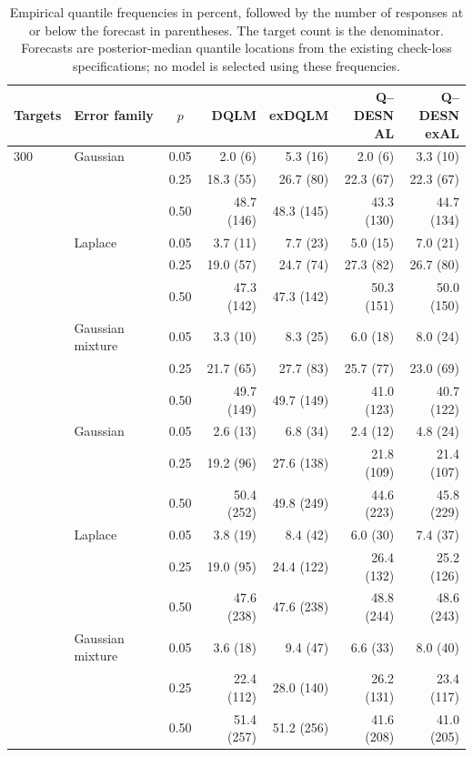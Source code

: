 \begin{table}[!htbp]
\centering
\footnotesize
{}
\setlength{\tabcolsep}{3.5pt}
\begin{tabular}{@{}llcrrrr@{}}
\toprule
Targets & Error family & $p$ & DQLM & exDQLM & \shortstack{Q--DESN\\AL} & \shortstack{Q--DESN\\exAL} \\
\midrule
300 & Gaussian & 0.05 & 2.0 (6) & 5.3 (16) & 2.0 (6) & 3.3 (10) \\
 &  & 0.25 & 18.3 (55) & 26.7 (80) & 22.3 (67) & 22.3 (67) \\
 &  & 0.50 & 48.7 (146) & 48.3 (145) & 43.3 (130) & 44.7 (134) \\
\addlinespace[3pt]
 & Laplace & 0.05 & 3.7 (11) & 7.7 (23) & 5.0 (15) & 7.0 (21) \\
 &  & 0.25 & 19.0 (57) & 24.7 (74) & 27.3 (82) & 26.7 (80) \\
 &  & 0.50 & 47.3 (142) & 47.3 (142) & 50.3 (151) & 50.0 (150) \\
\addlinespace[3pt]
 & Gaussian mixture & 0.05 & 3.3 (10) & 8.3 (25) & 6.0 (18) & 8.0 (24) \\
 &  & 0.25 & 21.7 (65) & 27.7 (83) & 25.7 (77) & 23.0 (69) \\
 &  & 0.50 & 49.7 (149) & 49.7 (149) & 41.0 (123) & 40.7 (122) \\
\addlinespace[3pt]
500 & Gaussian & 0.05 & 2.6 (13) & 6.8 (34) & 2.4 (12) & 4.8 (24) \\
 &  & 0.25 & 19.2 (96) & 27.6 (138) & 21.8 (109) & 21.4 (107) \\
 &  & 0.50 & 50.4 (252) & 49.8 (249) & 44.6 (223) & 45.8 (229) \\
\addlinespace[3pt]
 & Laplace & 0.05 & 3.8 (19) & 8.4 (42) & 6.0 (30) & 7.4 (37) \\
 &  & 0.25 & 19.0 (95) & 24.4 (122) & 26.4 (132) & 25.2 (126) \\
 &  & 0.50 & 47.6 (238) & 47.6 (238) & 48.8 (244) & 48.6 (243) \\
\addlinespace[3pt]
 & Gaussian mixture & 0.05 & 3.6 (18) & 9.4 (47) & 6.6 (33) & 8.0 (40) \\
 &  & 0.25 & 22.4 (112) & 28.0 (140) & 26.2 (131) & 23.4 (117) \\
 &  & 0.50 & 51.4 (257) & 51.2 (256) & 41.6 (208) & 41.0 (205) \\
\bottomrule
\end{tabular}
\caption{Empirical quantile frequencies in percent, followed by the number of responses at or below the forecast in parentheses. The target count is the denominator. Forecasts are posterior-median quantile locations from the existing check-loss specifications; no model is selected using these frequencies.}
\label{tab:supp-independent-quantile-calibration}
\end{table}
